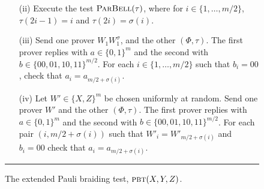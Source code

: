 \documentclass{toc}
\newcommand{\pbt}{\textsc{pbt}}
\newcommand{\pbellt}{\textsc{ParBell}}
\begin{document}
\begin{figure}[H]
\begin{itemize}
\begin{enumerate}
\begin{enumerate}
\item[(ii)] Execute the test $\pbellt(\tau)$, where for $i\in \{1,\ldots,m/2\}$, $\tau(2i-1)=i$ and $\tau(2i)=\sigma(i)$.
\item[(iii)] Send one prover $W_1  W_1^\sigma$, and the other $(\Phi,\tau)$. 
    The first prover replies with $a\in\{0, 1 \}^m$ and the second with $b\in \{00,01,10,11\}^{m/2}$. For each
    $i\in\{1,\ldots,m/2\}$ such that $b_i = 00$, check that $a_i  = a_{m/2+\sigma(i)}$. 
		\item[(iv)] Let $W'\in\{X,Z\}^m$ be chosen uniformly at random. Send one prover $W'$ and the other $(\Phi,\tau)$. The first prover replies  with $a\in\{0, 1 \}^m$ and the second with $b\in \{00,01,10,11\}^{m/2}$. For each pair $(i,m/2+\sigma(i))$ such that $W'_i=W'_{m/2+\sigma(i)}$ and $b_i=00$ check that $a_i=a_{m/2+\sigma(i)}$. 
\end{enumerate}
\end{enumerate}
\end{itemize}
\rule[2ex]{\textwidth}{0.5pt}\vspace{-.5cm}
\caption{The extended Pauli braiding test, $\pbt(X,Y,Z)$.}
\label{fig:e-pbt}
\end{figure}
\end{document}
